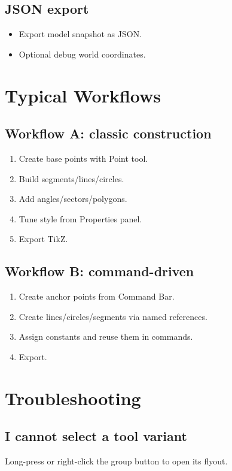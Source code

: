 \documentclass[11pt,a4paper]{article}
\begin{document}
\subsection{JSON export}
\begin{itemize}[leftmargin=1.5em]
  \item Export model snapshot as JSON.
  \item Optional debug world coordinates.
\end{itemize}

\section{Typical Workflows}
\subsection{Workflow A: classic construction}
\begin{enumerate}[leftmargin=1.5em]
  \item Create base points with Point tool.
  \item Build segments/lines/circles.
  \item Add angles/sectors/polygons.
  \item Tune style from Properties panel.
  \item Export TikZ.
\end{enumerate}

\subsection{Workflow B: command-driven}
\begin{enumerate}[leftmargin=1.5em]
  \item Create anchor points from Command Bar.
  \item Create lines/circles/segments via named references.
  \item Assign constants and reuse them in commands.
  \item Export.
\end{enumerate}

\section{Troubleshooting}
\subsection{I cannot select a tool variant}
Long-press or right-click the group button to open its flyout.
\end{document}
